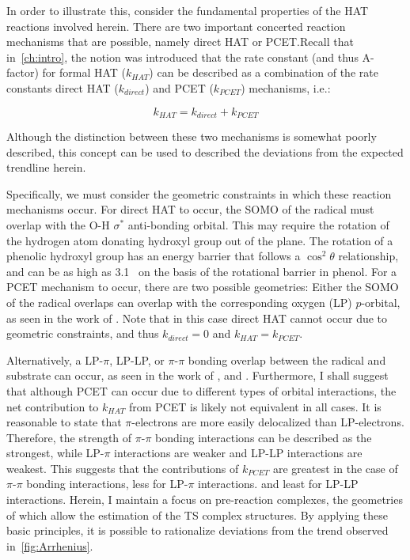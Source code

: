 In order to illustrate this, consider the fundamental properties of the HAT
reactions involved herein. There are two important concerted reaction
mechanisms that are possible, namely direct HAT or PCET.\@ Recall that
in~\ref{ch:intro}, the notion was introduced that the rate constant (and thus
A-factor) for formal HAT ($k_{HAT}$) can be described as a combination of the
rate constants direct HAT ($k_{direct}$) and PCET ($k_{PCET}$) mechanisms,
i.e.:

\begin{equation}
  k_{HAT} = k_{direct} + k_{PCET}
\end{equation}

\noindent Although the distinction between these two mechanisms is somewhat
poorly described, this concept can be used to described the deviations from the
expected trendline herein.

Specifically, we must consider the geometric constraints in which these
reaction mechanisms occur. For direct HAT to occur, the SOMO of the radical
must overlap with the O-H $\sigma^*$ anti-bonding orbital. This may require the
rotation of the hydrogen atom donating hydroxyl group out of the plane. The
rotation of a phenolic hydroxyl group has an energy barrier that follows a
$\cos^2 \theta$ relationship,\cite{Kojima1960} and can be as high as 3.1
\kcalmol\ on the basis of the rotational barrier in phenol.\cite{Kim1994} For a
PCET mechanism to occur, there are two possible geometries: Either the SOMO of
the radical overlaps can overlap with the corresponding oxygen (LP)
$p$-orbital, as seen in the work of \citet{Mayer2002}. Note that in this case
direct HAT cannot occur due to geometric constraints, and thus $k_{direct} = 0$
and $k_{HAT} = k_{PCET}$.

Alternatively, a LP-$\pi$, LP-LP, or $\pi$-$\pi$ bonding overlap between the
radical and substrate can occur, as seen in the work of \citet{DiLabio2005},
and \citet{DiLabio2007}. Furthermore, I shall suggest that although PCET can
occur due to different types of orbital interactions, the net contribution to
$k_{HAT}$ from PCET is likely not equivalent in all cases. It is reasonable to
state that $\pi$-electrons are more easily delocalized than LP-electrons.
Therefore, the strength of $\pi$-$\pi$ bonding interactions can be described as
the strongest, while LP-$\pi$ interactions are weaker and LP-LP interactions
are weakest. This suggests that the contributions of $k_{PCET}$ are greatest in
the case of $\pi$-$\pi$ bonding interactions, less for LP-$\pi$ interactions.
and least for LP-LP interactions. Herein, I maintain a focus on pre-reaction
complexes, the geometries of which allow the estimation of the TS complex
structures. By applying these basic principles, it is possible to rationalize
deviations from the trend observed in~\ref{fig:Arrhenius}.

